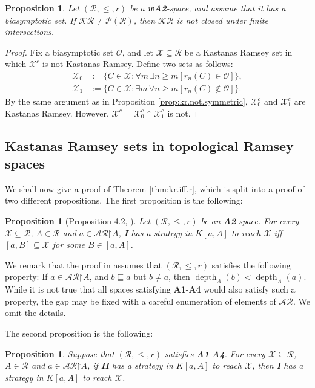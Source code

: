 \documentclass[11pt,reqno]{amsart}
\theoremstyle{plain}
\numberwithin{equation}{section}
\newtheorem{proposition}[theorem]{Proposition}
\theoremstyle{definition}
\newcommand{\func}{\operatorname}
\newcommand{\Po}{\cal{P}}
\newcommand{\cal}{\mathcal}
\newcommand{\bcal}[1]{\bm{\mathcal{#1}}}
\newcommand{\restrictedto}{\mathord{\upharpoonright}}
\newcommand{\X}{\cal{X}}
\renewcommand{\O}{\cal{O}}
\newcommand{\depth}{\func{depth}}
\begin{document}
\begin{proposition}
\label{prop:kr.not.closed.under.intersections}
    Let $(\cal{R},\leq,r)$ be a \textbf{wA2}-space, and assume that it has a biasymptotic set. If $\bcal{KR} \neq \Po(\cal{R})$, then $\bcal{KR}$ is not closed under finite intersections.
\end{proposition}

\begin{proof}
    Fix a biasymptotic set $\O$, and let $\X \subseteq \cal{R}$ be a Kastanas Ramsey set in which $\X^c$ is not Kastanas Ramsey. Define two sets as follows:
    \begin{align*}
        \X_0 &:= \{C \in \X : \forall m \, \exists n \geq m[r_n(C) \in \O]\}, \\
        \X_1 &:= \{C \in \X : \exists m \, \forall n \geq m[r_n(C) \notin \O]\}.
    \end{align*}
    By the same argument as in Proposition \ref{prop:kr.not.symmetric}, $\X_0^c$ and $\X_1^c$ are Kastanas Ramsey. However, $\X^c = \X_0^c \cap \X_1^c$ is not.
\end{proof}

\subsection{Kastanas Ramsey sets in topological Ramsey spaces} We shall now give a proof of Theorem \ref{thm:kr.iff.r}, which is split into a proof of two different propositions. The first proposition is the following:

\begin{proposition}[Proposition 4.2, \cite{CD23}]
\label{prop:kr.equals.r.for.I}
    Let $(\cal{R},\leq,r)$ be an \textbf{A2}-space. For every $\X \subseteq \cal{R}$, $A \in \cal{R}$ and $a \in \cal{AR}\restrictedto A$, \textbf{I} has a strategy in $K[a,A]$ to reach $\X$ iff $[a,B] \subseteq \X$ for some $B \in [a,A]$.
\end{proposition}

We remark that the proof in \cite{CD23} assumes that $(\cal{R},\leq,r)$ satisfies the following property: If $a \in \cal{AR}\restrictedto A$, and $b \sqsubseteq a$ but $b \neq a$, then $\depth_A(b) < \depth_A(a)$. While it is not true that all spaces satisfying \textbf{A1}-\textbf{A4} would also satisfy such a property, the gap may be fixed with a careful enumeration of elements of $\cal{AR}$. We omit the details.

The second proposition is the following:

\begin{proposition}
\label{prop:kr.II.strategy.gives.I}
    Suppose that $(\cal{R},\leq,r)$ satisfies \textbf{A1}-\textbf{A4}. For every $\X \subseteq \cal{R}$, $A \in \cal{R}$ and $a \in \cal{AR}\restrictedto A$, if \textbf{II} has a strategy in $K[a,A]$ to reach $\X$, then \textbf{I} has a strategy in $K[a,A]$ to reach $\X$.
\end{proposition}
\end{document}
